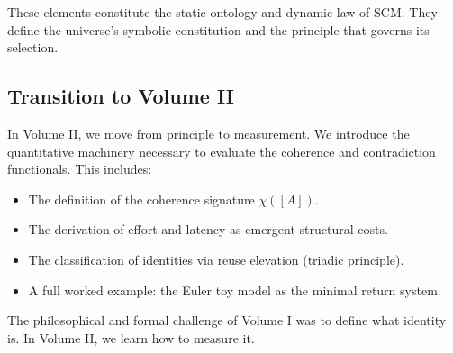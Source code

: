 These elements constitute the static ontology and dynamic law of SCM. They define the universe’s symbolic constitution and the principle that governs its selection.

\subsection*{Transition to Volume II}

In Volume II, we move from principle to measurement. We introduce the quantitative machinery necessary to evaluate the coherence and contradiction functionals. This includes:

\begin{itemize}
    \item The definition of the coherence signature $\chi([A])$.
    \item The derivation of effort and latency as emergent structural costs.
    \item The classification of identities via reuse elevation (triadic principle).
    \item A full worked example: the Euler toy model as the minimal return system.
\end{itemize}

The philosophical and formal challenge of Volume I was to define what identity is. In Volume II, we learn how to measure it.


